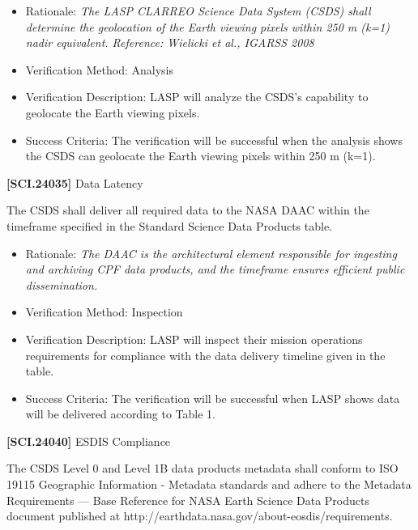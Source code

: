 \documentclass[12pt,oneside,oldfontcommands]{memoir}
\begin{document}
\begin{itemize}
\item{} Rationale: \emph{The LASP CLARREO Science Data System (CSDS) shall determine the geolocation of the Earth viewing pixels within 250 m (k=1) nadir equivalent. Reference: Wielicki et al., IGARSS 2008}

\item{} Verification Method: Analysis

\item{} Verification Description: \gls{LASP} will analyze the \gls{CSDS}'s capability to geolocate the Earth viewing pixels.

\item{} Success Criteria: The verification will be successful when the \gls{analysis} shows the \gls{CSDS} can geolocate the Earth viewing pixels within 250 m (k=1).

\end{itemize}

\textbf{[SCI.24035]} Data Latency

The \gls{CSDS} shall deliver all required data to the NASA \gls{DAAC} within the timeframe specified in the Standard Science Data Products table.

\begin{itemize}
\item{} Rationale: \emph{The DAAC is the architectural element responsible for ingesting and archiving CPF data products, and the timeframe ensures efficient public dissemination.}

\item{} Verification Method: Inspection

\item{} Verification Description: \gls{LASP} will inspect their mission operations requirements for compliance with the data delivery timeline given in the table.

\item{} Success Criteria: The verification will be successful when \gls{LASP} shows data will be delivered according to Table 1.

\end{itemize}

\textbf{[SCI.24040]} \gls{ESDIS} Compliance

The \gls{CSDS} Level 0 and Level 1B data products metadata shall conform to ISO 19115 Geographic Information - Metadata standards and adhere to the Metadata Requirements --- Base Reference for NASA Earth Science Data Products document published at http:\slash \slash earthdata.nasa.gov\slash about-eosdis\slash requirements.
\end{document}
